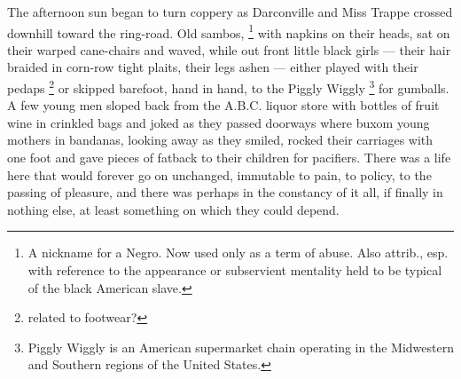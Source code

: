   The afternoon sun began to turn coppery as Darconville and Miss Trappe crossed
downhill toward the ring-road. Old sambos, 
\footnote{ A nickname for a Negro. Now used only as a term of abuse. Also
attrib., esp. with reference to the appearance or subservient mentality held to
be typical of the black American slave.
}
with napkins on their heads, sat on their warped 
cane-chairs and waved, while out front little black girls --- their
hair braided in corn-row tight plaits, their legs ashen 
--- either played with their pedaps 
\footnote{ \textdbend related to footwear?}
or skipped barefoot, hand in hand, to the Piggly Wiggly 
\footnote{Piggly Wiggly is an American supermarket chain operating in the
  Midwestern and Southern regions of the United States. }
for gumballs. 
A few young men sloped back from the A.B.C. liquor store with bottles of fruit
wine in crinkled 
bags and joked as they passed doorways where buxom 
young mothers in bandanas, 
looking away as they smiled, rocked their carriages with
one foot and gave pieces of fatback 
to their children for pacifiers. There was a
life here that would forever go on unchanged, immutable to pain, to policy, to
the passing of pleasure, and there was perhaps in the constancy of it all, if
finally in nothing else, at least something on which they could depend.

